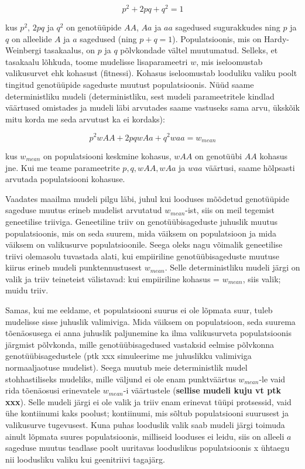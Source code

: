 \documentclass[]{book}
\begin{document}
\[p^2 + 2pq + q^2 = 1\]

kus \(p^2\), \(2pq\) ja \(q^2\) on genotüüpide \(AA\), \(Aa\) ja \(aa\) sagedused sugurakkudes ning \(p\) ja \(q\) on alleelide \(A\) ja \(a\) sagedused (ning \(p + q = 1\)).
Populatsioonis, mis on Hardy-Weinbergi tasakaalus, on \(p\) ja \(q\) põlvkondade vältel muutumatud. Selleks, et tasakaalu lõhkuda, toome mudelisse lisaparameetri \(w\), mis iseloomustab valikusurvet ehk kohasust (fitnessi).
Kohasus iseloomustab looduliku valiku poolt tingitud genotüüpide sageduste muutust populatsioonis.
Nüüd saame deterministliku mudeli (deterministliku, sest mudeli parameetritele kindlad väärtused omistades ja mudeli läbi arvutades saame vastuseks sama arvu, ükskõik mitu korda me seda arvutust ka ei kordaks):

\[p^2wAA + 2pqwAa + q^2waa = w_{mean}\]

kus \(w_{mean}\) on populatsiooni keskmine kohasus, \(wAA\) on genotüübi \(AA\) kohasus jne. Kui me teame parameetrite \(p, q, wAA, wAa\) ja \(waa\) väärtusi, saame hõlpsasti arvutada populatsiooni kohasuse.

Vaadates maailma mudeli pilgu läbi, juhul kui looduses mõõdetud genotüüpide sageduse muutus erineb mudelist arvutatud \(w_{mean}\)-ist, siis on meil tegemist geneetilise triiviga. Geneetiline triiv on genotüübisageduste juhuslik muutus populatsioonis, mis on seda suurem, mida väiksem on populatsioon ja mida väiksem on valikusurve populatsioonile. Seega oleks nagu võimalik geneetilise triivi olemasolu tuvastada alati, kui empiiriline genotüübisageduste muutuse kiirus erineb mudeli punktennustusest \(w_{mean}\). Selle deterministliku mudeli järgi on valik ja triiv teineteist välistavad: kui empiiriline kohasus = \(w_{mean}\), siis valik; muidu triiv.

Samas, kui me eeldame, et populatsiooni suurus ei ole lõpmata suur, tuleb mudelisse sisse juhuslik valimiviga. Mida väiksem on populatsioon, seda suurema tõenäosusega ei anna juhuslik paljunemine ka ilma valikusurveta populatsioonis järgmist põlvkonda, mille genotüübisagedused vastaksid eelmise põlvkonna genotüübisagedustele (ptk xxx simuleerime me juhuslikku valimiviga normaaljaotuse mudelist). Seega muutub meie deterministlik mudel stohhastiliseks mudeliks, mille väljund ei ole enam punktväärtus \(w_{mean}\)-le vaid rida tõenäosusi erinevatele \(w_{mean}\)-i väärtustele (\textbf{sellise mudeli kuju vt ptk xxx}). Selle mudeli järgi ei ole valik ja triiv enam erinevat tüüpi protsessid, vaid ühe kontiinumi kaks poolust; kontiinumi, mis sõltub populatsiooni suurusest ja valikusurve tugevusest. Kuna puhas looduslik valik saab mudeli järgi toimuda ainult lõpmata suures populatsioonis, milliseid looduses ei leidu, siis on alleeli \(a\) sageduse muutus teadlase poolt uuritavas looduslikus populatsioonis x ühtaegu nii loodusliku valiku kui geenitriivi tagajärg.
\end{document}
